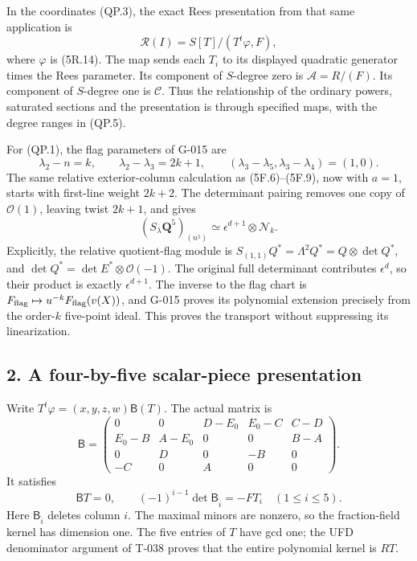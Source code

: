\documentclass[
  10pt,
]{article}
\begin{document}
In the coordinates (QP.3), the exact Rees presentation from that same
application is \[
\mathcal R(I)=S[T]/(T^t\varphi,F),
\tag{QP.6}
\] where \(\varphi\) is (5R.14). The map sends each \(T_i\) to its
displayed quadratic generator times the Rees parameter. Its component of
\(S\)-degree zero is \(\mathcal A=R/(F)\). Its component of \(S\)-degree
one is \(\mathcal C\). Thus the relationship of the ordinary powers,
saturated sections and the presentation is through specified maps, with
the degree ranges in (QP.5).

For (QP.1), the flag parameters of G-015 are \[
\lambda_2-n=k,\qquad \lambda_2-\lambda_3=2k+1,
\qquad(\lambda_3-\lambda_5,\lambda_3-\lambda_4)=(1,0).
\] The same relative exterior-column calculation as (5F.6)--(5F.9), now
with \(a=1\), starts with first-line weight \(2k+2\). The determinant
pairing removes one copy of \(\mathcal O(1)\), leaving twist \(2k+1\),
and gives \[
\boxed{(S_\lambda\mathbf Q^5)_{(n^5)}
\simeq\epsilon^{d+1}\otimes\mathcal N_k.}
\tag{QP.7}
\] Explicitly, the relative quotient-flag module is
\(S_{(1,1)}Q^*=\Lambda^2Q^*=Q\otimes\det Q^*\), and
\(\det Q^*=\det E^*\otimes\mathcal O(-1)\). The original full
determinant contributes \(\epsilon^d\), so their product is exactly
\(\epsilon^{d+1}\). The inverse to the flag chart is
\(F_{\rm flag}\mapsto u^{-k}F_{\rm flag}(v(X))\), and G-015 proves its
polynomial extension precisely from the order-\(k\) five-point ideal.
This proves the transport without suppressing its linearization.

\subsection{2. A four-by-five scalar-piece
presentation}\label{a-four-by-five-scalar-piece-presentation}

Write \(T^t\varphi=(x,y,z,w)\mathsf B(T)\). The actual matrix is \[
\mathsf B=\begin{pmatrix}
0&0&D-E_0&E_0-C&C-D\\
E_0-B&A-E_0&0&0&B-A\\
0&D&0&-B&0\\
-C&0&A&0&0
\end{pmatrix}.
\tag{QP.8}
\] It satisfies \[
\mathsf B T=0,\qquad
(-1)^{i-1}\det\mathsf B_{\widehat i}=-FT_i\quad(1\le i\le5).
\tag{QP.9}
\] Here \(\mathsf B_{\widehat i}\) deletes column \(i\). The maximal
minors are nonzero, so the fraction-field kernel has dimension one. The
five entries of \(T\) have gcd one; the UFD denominator argument of
T-038 proves that the entire polynomial kernel is \(RT\).
\end{document}
